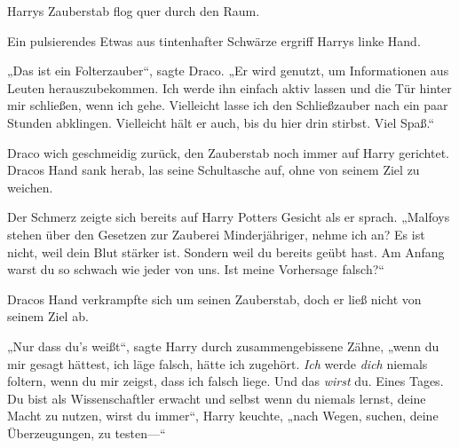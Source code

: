 
Harrys Zauberstab flog quer durch den Raum.


Ein pulsierendes Etwas aus tintenhafter Schwärze ergriff Harrys linke Hand.

„Das ist ein Folterzauber“, sagte Draco.
„Er wird genutzt, um Informationen aus Leuten herauszubekommen. Ich werde ihn einfach aktiv lassen und die Tür hinter mir schließen, wenn ich gehe. Vielleicht lasse ich den Schließzauber nach ein paar Stunden abklingen. Vielleicht hält er auch, bis du hier drin stirbst. Viel Spaß.“

Draco wich geschmeidig zurück, den Zauberstab noch immer auf Harry gerichtet. Dracos Hand sank herab, las seine Schultasche auf, ohne von seinem Ziel zu weichen.

Der Schmerz zeigte sich bereits auf Harry Potters Gesicht als er sprach.
„Malfoys stehen über den Gesetzen zur Zauberei Minderjähriger, nehme ich an? Es ist nicht, weil dein Blut stärker ist. Sondern weil du bereits geübt hast. Am Anfang warst du so schwach wie jeder von uns. Ist meine Vorhersage falsch?“

Dracos Hand verkrampfte sich um seinen Zauberstab, doch er ließ nicht von seinem Ziel ab.

„Nur dass du’s weißt“, sagte Harry durch zusammengebissene Zähne, „wenn du mir gesagt hättest, ich läge falsch, hätte ich zugehört. \emph{Ich} werde \emph{dich} niemals foltern, wenn du mir zeigst, dass ich falsch liege. Und das \emph{wirst} du. Eines Tages. Du bist als Wissenschaftler erwacht und selbst wenn du niemals lernst, deine Macht zu nutzen, wirst du immer“, Harry keuchte, „nach Wegen, suchen, deine Überzeugungen, zu testen—“

